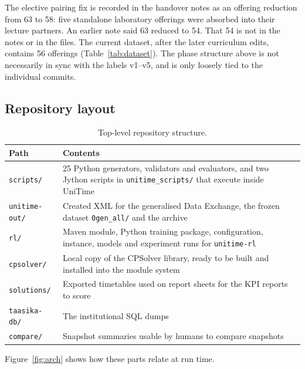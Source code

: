 The elective pairing fix is recorded in the handover notes as an offering reduction from 63 to 58:
five standalone laboratory offerings were absorbed into their lecture partners. An earlier note
said 63 reduced to 54. That 54 is not in the notes or in the files. The current dataset, after
the later curriculum edits, contains 56 offerings (Table~\ref{tab:dataset}). The phase structure
above is not necessarily in sync with the labels v1--v5, and is only loosely tied to the
individual commits.

\subsection{Repository layout}

\begin{table}[H]
\centering
\caption{Top-level repository structure.}
\label{tab:layout}
\footnotesize
\begin{tabular}{@{}L{3.0cm}L{11.9cm}@{}}
\toprule
\textbf{Path} & \textbf{Contents} \\
\midrule
\texttt{scripts/}     & 25 Python generators, validators and evaluators, and two Jython scripts in
                        \texttt{unitime\_scripts/} that execute inside UniTime \\
\texttt{unitime-out/} & Created XML for the generalised Data Exchange, the frozen dataset
                        \texttt{0gen\_all/} and the archive \\
\texttt{rl/}          & Maven module, Python training package, configuration, instance, models and
                        experiment runs for \texttt{unitime-rl} \\
\texttt{cpsolver/}    & Local copy of the CPSolver library, ready to be built and installed into
                        the module system \\
\texttt{solutions/}   & Exported timetables used on report sheets for the KPI reports to score \\
\texttt{taasika-db/}  & The institutional SQL dumps \\
\texttt{compare/}     & Snapshot summaries usable by humans to compare snapshots \\
\bottomrule
\end{tabular}
\end{table}

Figure~\ref{fig:arch} shows how these parts relate at run time.


